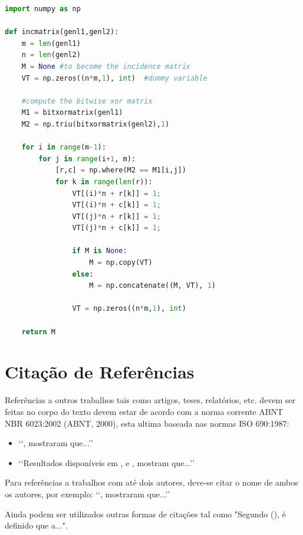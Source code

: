 \begin{lstlisting}[language=Python, caption=Exemplo em Python, captionpos=b, label=code:py]
import numpy as np
 
def incmatrix(genl1,genl2):
    m = len(genl1)
    n = len(genl2)
    M = None #to become the incidence matrix
    VT = np.zeros((n*m,1), int)  #dummy variable
 
    #compute the bitwise xor matrix
    M1 = bitxormatrix(genl1)
    M2 = np.triu(bitxormatrix(genl2),1) 
 
    for i in range(m-1):
        for j in range(i+1, m):
            [r,c] = np.where(M2 == M1[i,j])
            for k in range(len(r)):
                VT[(i)*n + r[k]] = 1;
                VT[(i)*n + c[k]] = 1;
                VT[(j)*n + r[k]] = 1;
                VT[(j)*n + c[k]] = 1;
 
                if M is None:
                    M = np.copy(VT)
                else:
                    M = np.concatenate((M, VT), 1)
 
                VT = np.zeros((n*m,1), int)
 
    return M
\end{lstlisting}

\section{Citação de Referências}

Referências a outros trabalhos tais como artigos, teses, relatórios, etc. devem ser feitas no corpo do texto devem estar de acordo com a norma corrente ABNT NBR 6023:2002 (ABNT, 2000), esta ultima baseada nas normas ISO 690:1987:
\begin{itemize}
	\item \lq\lq \cite{bordalo1989}, mostraram que...\rq\rq

	\item \lq\lq Resultados disponíveis em \cite{coimbra1978}, \cite{clark1986} 
	e \cite{sparrow1980}, mostram que...\rq\rq
\end{itemize}

Para referências a trabalhos com até dois autores, deve-se citar o nome de ambos os autores, por exemplo: \lq\lq \cite{soviero1997}, mostraram que...\rq\rq

Ainda podem ser utilizados outras formas de citações tal como "Segundo  (\citeyear{coimbra1978}), é definido que a...".

